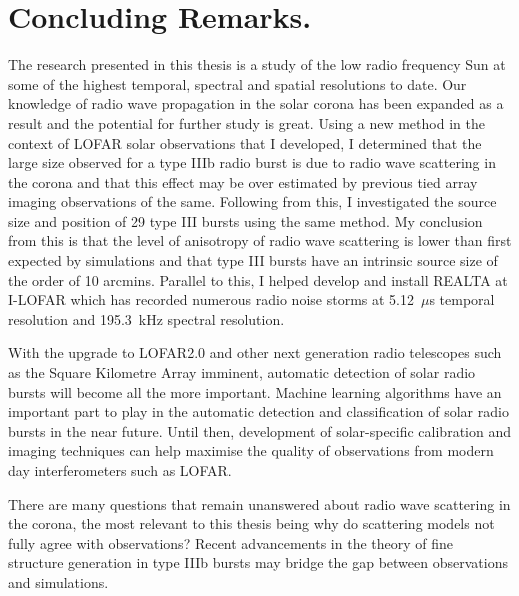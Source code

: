 
\section{Concluding Remarks.}
The research presented in this thesis is a study of the low radio frequency Sun at some of the highest temporal, spectral and spatial resolutions to date. Our knowledge of radio wave propagation in the solar corona has been expanded as a result and the potential for further study is great. Using a new method in the context of LOFAR solar observations that I developed, I determined that the large size observed for a type IIIb radio burst is due to radio wave scattering in the corona and that this effect may be over estimated by previous tied array imaging observations of the same. Following from this, I investigated the source size and position of 29 type III bursts using the same method. My conclusion from this is that the level of anisotropy of radio wave scattering is lower than first expected by simulations and that type III bursts have an intrinsic source size of the order of 10 arcmins. Parallel to this, I helped develop and install REALTA at I-LOFAR which has recorded numerous radio noise storms at 5.12~$\mu$s temporal resolution and 195.3~kHz spectral resolution. 

With the upgrade to LOFAR2.0 and other next generation radio telescopes such as the Square Kilometre Array \citep[SKA;][]{McMullin2020} imminent, automatic detection of solar radio bursts will become all the more important. Machine learning algorithms have an important part to play in the automatic detection and classification of solar radio bursts in the near future. Until then, development of solar-specific calibration and imaging techniques can help maximise the quality of observations from modern day interferometers such as LOFAR.  

There are many questions that remain unanswered about radio wave scattering in the corona, the most relevant to this thesis being why do scattering models not fully agree with observations? Recent advancements in the theory of fine structure generation in type IIIb bursts may bridge the gap between observations and simulations.


